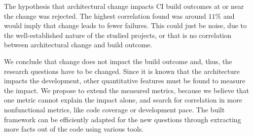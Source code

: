\documentclass[sigplan, anonymous, review]{acmart}
\begin{document}
The hypothesis that architectural change impacts CI build outcomes at or near the change was rejected. The highest correlation found was around $11\%$ and would imply that change leads to fewer failures. This could just be noise, due to the well-established nature of the studied projects, or that is no correlation between architectural change and build outcome. 

We conclude that change does not impact the build outcome and, thus, the research questions have to be changed. Since it is known that the architecture impacts the development, other quantitative features must be found to measure the impact. We propose to extend the measured metrics, because we believe that one metric cannot explain the impact alone, and search for correlation in more nonfunctional metrics, like code coverage or development pace.
The built framework can be efficiently adapted for the new questions through extracting more facts out of the code using various tools. 



\end{document}
